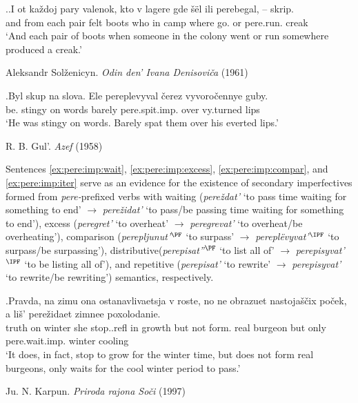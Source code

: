 \ex.\ag.\label{ex:pere:imp:space1}I ot ka\v{z}doj pary valenok, kto v lagere gde \v{s}\"{e}l ili perebegal, -- skrip.\\
and from each pair {felt boots} who in camp where go. or pere.run. {} creak\\
\vspace{0.5em}
`And each pair of boots when someone in the colony went or run somewhere produced a creak.'
\begin{flushright}
\vspace{-0.5em}
Aleksandr Sol\v{z}enicyn. \textit{Odin den' Ivana Denisovi\v{c}a} (1961)
\end{flushright}
\bg.\label{ex:pere:imp:space2}Byl skup na slova. Ele pereplevyval \v{c}erez vyvoro\v{c}ennye guby.\\
be. stingy on words barely pere.spit.imp. over vy.turned lips\\
\vspace{0.5em}
`He was stingy on words. Barely spat them over his everted lips.'
\begin{flushright}
\vspace{-0.5em}
R. B. Gul'. \textit{Azef} (1958)	
\end{flushright}

Sentences \ref{ex:pere:imp:wait}, \ref{ex:pere:imp:excess}, \ref{ex:pere:imp:compar}, and \ref{ex:pere:imp:iter} serve as an evidence for the existence of secondary imperfectives formed from \textit{pere-}prefixed verbs with waiting (\textit{pere\v{z}dat'} `to pass time waiting for something to end' $\rightarrow$ \textit{pere\v{z}idat'}  `to pass/be passing time waiting for something to end'), excess (\textit{peregret'} `to overheat' $\rightarrow$ \textit{peregrevat'} `to overheat/be overheating'), comparison (\textit{perepljunut'$^{\PF}$} `to surpass' $\rightarrow$ \textit{perepl\"{e}vyvat'$^{\IPF}$} `to surpass/be surpassing'), distributive(\textit{perepisat''$^{\PF}$} `to list all of' $\rightarrow$ \textit{perepisyvat'$^{\IPF}$} `to be listing all of'), and repetitive (\textit{perepisat'} `to rewrite' $\rightarrow$ \textit{perepisyvat'} `to rewrite/be rewriting') semantics, respectively.

\exg.\label{ex:pere:imp:wait}Pravda, na zimu ona ostanavlivaetsja v roste, no ne obrazuet nastoja\v{s}\v{c}ix po\v{c}ek, a li\v{s}' pere\v{z}idaet zimnee poxolodanie.\\
truth on winter she stop..refl in growth but not form. real burgeon but only pere.wait.imp. winter cooling\\
\vspace{0.5em}
`It does, in fact, stop to grow for the winter time, but does not form real burgeons, only waits for the cool winter period to pass.'
\begin{flushright}
\vspace{-0.5em}
Ju. N. Karpun. \textit{Priroda rajona So\v{c}i} (1997)
\end{flushright}

